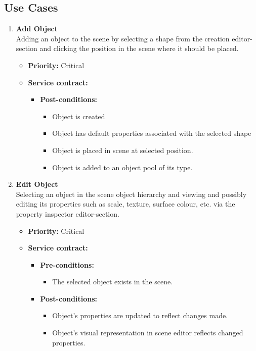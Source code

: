 \documentclass[a4paper,12pt]{article}
\begin{document}
	\subsection{Use Cases}
		\begin{enumerate}
			\item {\large \textbf{Add Object}}\\
			Adding an object to the scene by selecting a shape from the creation editor-section and clicking the position in the scene where it should be placed.
			\begin{itemize}
				\item \textbf{Priority:} Critical
				\item \textbf{Service contract:}
					\begin{itemize}
						\item \textbf{Post-conditions:}
							\begin{itemize}
								\item Object is created
								\item Object has default properties associated with the selected shape
								\item Object is placed in scene at selected position.
								\item Object is added to an object pool of its type.
							\end{itemize}
					\end{itemize}
			\end{itemize}
			
			\item {\large \textbf{Edit Object}}\\
			Selecting an object in the scene object hierarchy and viewing and possibly editing its properties such as scale, texture, surface colour, etc. via the property inspector editor-section.
			\begin{itemize}
				\item \textbf{Priority:} Critical
				\item \textbf{Service contract:}
				\begin{itemize}
					\item \textbf{Pre-conditions:}
						\begin{itemize}
							\item The selected object exists in the scene.
						\end{itemize}
					\item \textbf{Post-conditions:}
						\begin{itemize}
							\item Object's properties are updated to reflect changes made.
							\item Object's visual representation in scene editor reflects changed properties.
						\end{itemize}
				\end{itemize}
			\end{itemize}
			

\end{enumerate}
\end{document}
